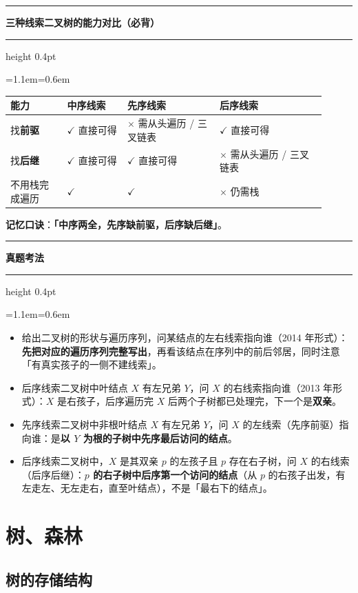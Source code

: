 \documentclass[11pt,openany,UTF8]{ctexbook}
\newcommand{\callouthead}[2]{%
  \par\addvspace{7pt}\noindent
  {\color{#1}\rule[-0.15em]{3pt}{1.05em}}\hspace{0.5em}%
  {\bfseries\color{#1}#2}\par\nobreak\vspace{-0.35em}%
  {\color{rulesep}\hrule height 0.4pt}\nobreak\vspace{0.45em}%
  \begingroup\small\setlength{\parindent}{0pt}%
  \leftskip=1.1em\rightskip=0.6em\noindent\ignorespaces}
\newcommand{\calloutend}{\par\endgroup\addvspace{7pt}}
\newenvironment{callkey}[1]{\callouthead{keybar}{#1}}{\calloutend}
\newenvironment{callexam}[1]{\callouthead{exambar}{#1}}{\calloutend}
\begin{document}
\begin{callkey}{三种线索二叉树的能力对比（必背）}
\begingroup\small\setlength{\tabcolsep}{4.0pt}
\begin{longtable}{@{}L{0.1676\linewidth}L{0.1781\linewidth}L{0.2619\linewidth}L{0.3038\linewidth}@{}}
\toprule
\textbf{能力} & \textbf{中序线索} & \textbf{先序线索} & \textbf{后序线索} \\
\midrule
\endhead
找\textbf{前驱} & $\checkmark$ 直接可得 & $\times$ 需从头遍历 / 三叉链表 & $\checkmark$ 直接可得 \\
找\textbf{后继} & $\checkmark$ 直接可得 & $\checkmark$ 直接可得 & $\times$ 需从头遍历 / 三叉链表 \\
不用栈完成遍历 & $\checkmark$ & $\checkmark$ & $\times$ 仍需栈 \\
\bottomrule
\end{longtable}
\endgroup

\textbf{记忆口诀}：\textbf{「中序两全，先序缺前驱，后序缺后继」}。

\end{callkey}

\begin{callexam}{真题考法}
\begin{itemize}
\item 给出二叉树的形状与遍历序列，问某结点的左右线索指向谁（2014 年形式）：\textbf{先把对应的遍历序列完整写出}，再看该结点在序列中的前后邻居，同时注意「有真实孩子的一侧不建线索」。
\item 后序线索二叉树中叶结点 $X$ 有左兄弟 $Y$，问 $X$ 的右线索指向谁（2013 年形式）：$X$ 是右孩子，后序遍历完 $X$ 后两个子树都已处理完，下一个是\textbf{双亲}。
\item 先序线索二叉树中非根叶结点 $X$ 有左兄弟 $Y$，问 $X$ 的左线索（先序前驱）指向谁：是\textbf{以 $Y$ 为根的子树中先序最后访问的结点}。
\item 后序线索二叉树中，$X$ 是其双亲 $p$ 的左孩子且 $p$ 存在右子树，问 $X$ 的右线索（后序后继）：\textbf{$p$ 的右子树中后序第一个访问的结点}（从 $p$ 的右孩子出发，有左走左、无左走右，直至叶结点），不是「最右下的结点」。
\end{itemize}
\end{callexam}

\section{树、森林}

\subsection{树的存储结构}
\end{document}
